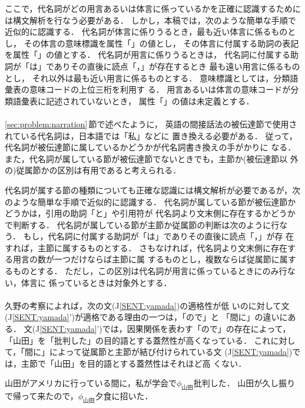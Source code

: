 ここで，代名詞がどの用言あるいは体言に係っているかを正確に認識するために
は構文解析を行なう必要がある．
しかし，本稿では，次のような簡単な手順で近似的に認識する．
代名詞が体言に係りうるとき，最も近い体言に係るものとし，
その体言の意味標識を属性「\GVNRSEM」の値とし，
その体言に付属する助詞の表記を属性「\GVNRFZKG」の値とする．
代名詞が用言に係りうるときは，
代名詞に付属する助詞が「は」でありその直後に読点「，」が存在するとき
最も遠い用言に係るものとし，
それ以外は最も近い用言に係るものとする．
意味標識としては，分類語彙表\cite{NLRI84}の意味コードの上位三桁を利用す
る．
用言あるいは体言の意味コードが分類語彙表に記述されていないとき，
属性「\GVNRSEM」の値は未定義とする．

\paragraph{\CLSTYPE}

\ref{sec:problem:narration}\,節で述べたように，
英語の間接話法の被伝達節で使用されている代名詞は，日本語では「私」などに
置き換える必要がある．
従って，代名詞が被伝達節に属しているかどうかが代名詞書き換えの手がかりに
なる．
また，代名詞が属している節が被伝達節でないときでも，主節か(被伝達節以
外の)従属節かの区別は有用であると考えられる．

代名詞が属する節の種類についても正確な認識には構文解析が必要であるが，次
のような簡単な手順で近似的に認識する．
代名詞が属している節が被伝達節かどうかは，引用の助詞「と」や引用符が
代名詞より文末側に存在するかどうかで判断する．
代名詞が属している節が主節か従属節の判断は次のように行なう．
もし，代名詞に付属する助詞が「は」でありその直後に読点「，」が存
在すれば，主節に属するものとする．
さもなければ，代名詞より文末側に存在する用言の数が一つだけならば主節に属
するものとし，複数ならば従属節に属するものとする．
ただし，この区別は代名詞が用言に係っているときにのみ行ない，体言に
係っているときは対象外とする．

\paragraph{\CLSEND}

久野の考察\cite{Kuno83}によれば，次の文(J\ref{SENT:yamada})の適格性が低
いのに対して文(J\ref{SENT:yamada}')が適格である理由の一つは，「ので」と
「間に」の違いにある．
文(J\ref{SENT:yamada}')では，因果関係を表わす「ので」の存在によって，
「山田」を「批判した」の目的語とする蓋然性が高くなっている．
これに対して，「間に」によって従属節と主節が結び付けられている文
(J\ref{SENT:yamada})では，主節で「山田」を目的語とする蓋然性はそれほど高
くない．
\begin{JSENT}
\sentJ 山田がアメリカに行っている間に，私が学会で$\phi_{山田}$批判した．
\sentJJ 山田が久し振りで帰って来たので，$\phi_{山田}$夕食に招いた．
\label{SENT:yamada}
\end{JSENT}


